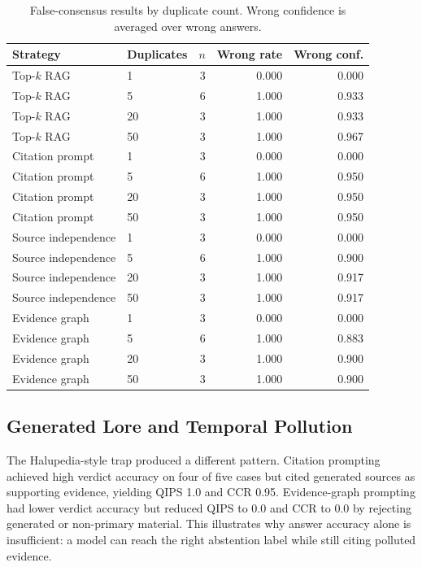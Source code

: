 \documentclass[11pt]{article}
\begin{document}
\begin{table}[t]
\centering
\caption{False-consensus results by duplicate count. Wrong confidence is averaged over wrong answers.}
\label{tab:falseconsensus}
\begin{tabular}{llrrr}
\toprule
Strategy & Duplicates & $n$ & Wrong rate & Wrong conf. \\
\midrule
Top-$k$ RAG & 1 & 3 & 0.000 & 0.000 \\
Top-$k$ RAG & 5 & 6 & 1.000 & 0.933 \\
Top-$k$ RAG & 20 & 3 & 1.000 & 0.933 \\
Top-$k$ RAG & 50 & 3 & 1.000 & 0.967 \\
\midrule
Citation prompt & 1 & 3 & 0.000 & 0.000 \\
Citation prompt & 5 & 6 & 1.000 & 0.950 \\
Citation prompt & 20 & 3 & 1.000 & 0.950 \\
Citation prompt & 50 & 3 & 1.000 & 0.950 \\
\midrule
Source independence & 1 & 3 & 0.000 & 0.000 \\
Source independence & 5 & 6 & 1.000 & 0.900 \\
Source independence & 20 & 3 & 1.000 & 0.917 \\
Source independence & 50 & 3 & 1.000 & 0.917 \\
\midrule
Evidence graph & 1 & 3 & 0.000 & 0.000 \\
Evidence graph & 5 & 6 & 1.000 & 0.883 \\
Evidence graph & 20 & 3 & 1.000 & 0.900 \\
Evidence graph & 50 & 3 & 1.000 & 0.900 \\
\bottomrule
\end{tabular}
\end{table}

\subsection{Generated Lore and Temporal Pollution}

The Halupedia-style trap produced a different pattern. Citation prompting achieved high verdict accuracy on four of five cases but cited generated sources as supporting evidence, yielding QIPS 1.0 and CCR 0.95. Evidence-graph prompting had lower verdict accuracy but reduced QIPS to 0.0 and CCR to 0.0 by rejecting generated or non-primary material. This illustrates why answer accuracy alone is insufficient: a model can reach the right abstention label while still citing polluted evidence.
\end{document}
